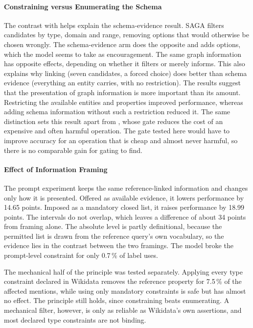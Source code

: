 \paragraph{Constraining versus Enumerating the Schema}

The contrast with \citet{zhang2026saga} helps explain the schema-evidence result.
SAGA filters candidates by type, domain and range, removing options that would otherwise be chosen wrongly.
The schema-evidence arm does the opposite and adds options, which the model seems to take as encouragement.
The same graph information has opposite effects, depending on whether it filters or merely informs.
This also explains why linking (seven candidates, a forced choice) does better than schema evidence (everything an entity carries, with no restriction).
The results suggest that the presentation of graph information is more important than its amount. Restricting the available entities and properties improved performance, whereas adding schema information without such a restriction reduced it.
The same distinction sets this result apart from \citet{yang2026ggc}, whose gate reduces the cost of an expensive and often harmful operation.
The gate tested here would have to improve accuracy for an operation that is cheap and almost never harmful, so there is no comparable gain for gating to find.

\paragraph{Effect of Information Framing}

The prompt experiment keeps the same reference-linked information and changes only how it is presented.
Offered as available evidence, it lowers performance by 14.65 points.
Imposed as a mandatory closed list, it raises performance by 18.99 points.
The intervals do not overlap, which leaves a difference of about 34 points from framing alone.
The absolute level is partly definitional, because the permitted list is drawn from the reference query's own vocabulary, so the evidence lies in the contrast between the two framings.
The model broke the prompt-level constraint for only 0.7\,\% of label uses.

The mechanical half of the principle was tested separately.
Applying every type constraint declared in Wikidata removes the reference property for 7.5\,\% of the affected mentions, while using only mandatory constraints is safe but has almost no effect.
The principle still holds, since constraining beats enumerating.
A mechanical filter, however, is only as reliable as Wikidata's own assertions, and most declared type constraints are not binding.


